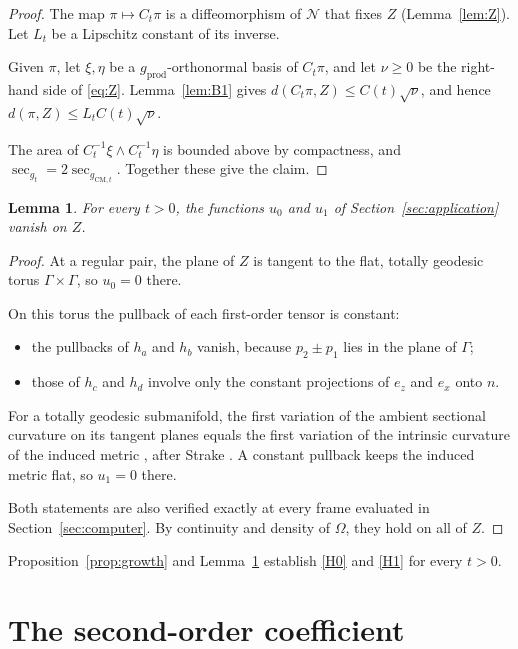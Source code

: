 \documentclass[11pt]{amsart}
\newtheorem{lemma}[theorem]{Lemma}
\theoremstyle{definition}
\theoremstyle{remark}
\newcommand{\sect}{\operatorname{sec}}
\newcommand{\gprod}{g_{\mathrm{prod}}}
\newcommand{\gCM}{g_{\mathrm{CM},t}}
\newcommand{\Gr}{\mathcal{N}}
\begin{document}
\begin{proof}
The map $\pi\mapsto C_t\pi$ is a diffeomorphism of $\Gr$ that fixes $Z$ (Lemma~\ref{lem:Z}). Let $L_t$ be a Lipschitz constant of its inverse.

Given $\pi$, let $\xi,\eta$ be a $\gprod$-orthonormal basis of $C_t\pi$, and let $\nu\ge0$ be the right-hand side of \eqref{eq:Z}. Lemma~\ref{lem:B1} gives $d(C_t\pi,Z)\le C(t)\sqrt\nu$, and hence $d(\pi,Z)\le L_tC(t)\sqrt\nu$.

The area of $C_t^{-1}\xi\wedge C_t^{-1}\eta$ is bounded above by compactness, and $\sect_{g_t}=2\sect_{\gCM}$. Together these give the claim.
\end{proof}

\begin{lemma}\label{lem:firstvar}
For every $t>0$, the functions $u_0$ and $u_1$ of Section~\ref{sec:application} vanish on $Z$.
\end{lemma}

\begin{proof}
At a regular pair, the plane of $Z$ is tangent to the flat, totally geodesic torus $\Gamma\times\Gamma$, so $u_0=0$ there.

On this torus the pullback of each first-order tensor is constant:
\begin{itemize}[leftmargin=*]
\item the pullbacks of $h_a$ and $h_b$ vanish, because $p_2\pm p_1$ lies in the plane of $\Gamma$;
\item those of $h_c$ and $h_d$ involve only the constant projections of $e_z$ and $e_x$ onto $n$.
\end{itemize}
For a totally geodesic submanifold, the first variation of the ambient sectional curvature on its tangent planes equals the first variation of the intrinsic curvature of the induced metric \cite[Lemma~3.7]{Be}, after Strake \cite{St1}. A constant pullback keeps the induced metric flat, so $u_1=0$ there.

Both statements are also verified exactly at every frame evaluated in Section~\ref{sec:computer}. By continuity and density of $\Omega$, they hold on all of $Z$.
\end{proof}

Proposition~\ref{prop:growth} and Lemma~\ref{lem:firstvar} establish \ref{H0} and \ref{H1} for every $t>0$.

\section{The second-order coefficient}\label{sec:quadratic}
\end{document}
